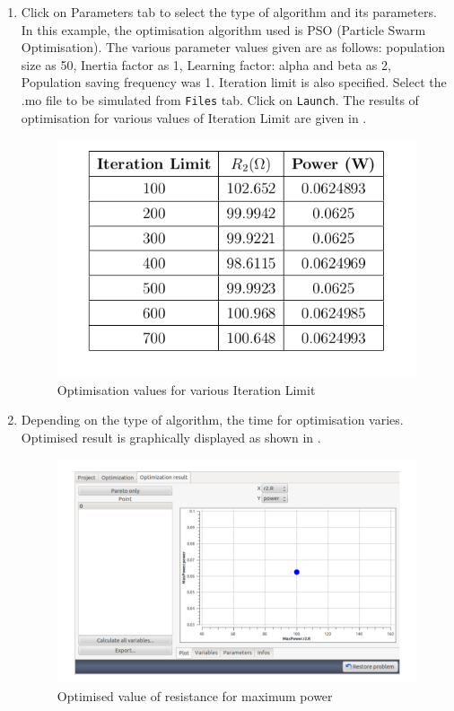\begin{enumerate}
\item Click on Parameters tab to select the type of algorithm and its parameters. In this example, the optimisation algorithm used is PSO (Particle Swarm Optimisation). The various parameter values given are as follows: population size as 50, Inertia factor as 1, Learning factor: alpha and beta as 2, Population saving frequency was 1. Iteration limit is also specified. Select the .mo file to be simulated from {\tt Files} tab. Click on {\tt Launch}. The results of optimisation for various values of Iteration Limit are given in .

\begin{figure}[h]
\centering
\includegraphics[width=\lgfig]{list_of_figures/10.png}
\caption{Optimisation values for various Iteration Limit }
\label{table}
\end{figure}

\item Depending on the type of algorithm, the time for optimisation varies. Optimised result is graphically displayed as shown in . 

\begin{figure}
\centering
\includegraphics[width=\hgfig]{list_of_figures/11.png}
\caption{Optimised value of resistance for maximum power }
\label{om-optimised}
\end{figure}

\end{enumerate}

